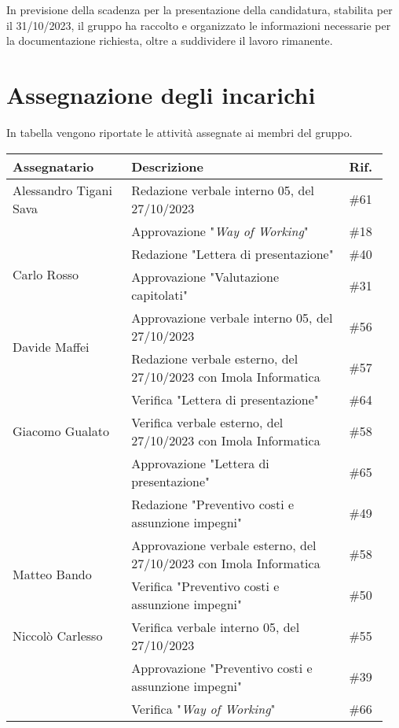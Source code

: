 \noindent 
In previsione della scadenza per la presentazione della candidatura, stabilita per il 31/10/2023, il gruppo ha raccolto e organizzato le informazioni necessarie per la documentazione richiesta, oltre a suddividere il lavoro rimanente.


\section{Assegnazione degli incarichi}
In tabella vengono riportate le attività assegnate ai membri del gruppo.
\begin{center}
    {
    \renewcommand{\arraystretch}{1.5}
    \begin{tabular}{p{0.30\linewidth}|p{0.55\linewidth}|p{0.10\linewidth}}
		\textbf{Assegnatario}   		&   \textbf{Descrizione}   & \textbf{Rif.}     \\
		\hline
		Alessandro Tigani Sava  		&	Redazione verbale interno 05, del 27/10/2023 & \#61 	\\
        \cline{2-3}
										&	Approvazione "\textit{Way of Working}" & \#18 	\\
		\hline
		\multirow{2}{*}{Carlo Rosso}	&	Redazione "Lettera di presentazione" & \#40 	\\
		\cline{2-3}
										&	Approvazione "Valutazione capitolati" & \#31 	\\
		\hline
		\multirow{2}{*}{Davide Maffei}	&	Approvazione verbale interno 05, del 27/10/2023  & \#56 	\\
		\cline{2-3}
										&	Redazione verbale esterno, del 27/10/2023 con Imola Informatica & \#57 	\\
        \cline{2-3}
										&	Verifica "Lettera di presentazione" & \#64 	\\
		\hline
		Giacomo Gualato					&	Verifica verbale esterno, del 27/10/2023 con Imola Informatica & \#58 	\\
        \cline{2-3}
										&	Approvazione "Lettera di presentazione" & \#65 	\\
        \cline{2-3}
										&	Redazione "Preventivo costi e assunzione impegni" & \#49 	\\
		\hline
		\multirow{2}{*}{Matteo Bando}	&	Approvazione verbale esterno, del 27/10/2023 con Imola Informatica & \#58 	\\
		\cline{2-3}
										&	Verifica "Preventivo costi e assunzione impegni" & \#50 	\\
		\hline
		Niccolò Carlesso				&	Verifica verbale interno 05, del 27/10/2023 & \#55 	\\
        \cline{2-3}
										&	Approvazione "Preventivo costi e assunzione impegni" & \#39 	\\
        \cline{2-3}
										&	Verifica "\textit{Way of Working}" & \#66 	\\
    \end{tabular}
    }
\end{center}